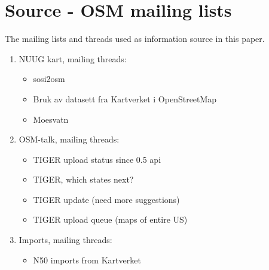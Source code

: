 \documentclass[12pt, a4paper]{report}   	%
\begin{document}
	
%







\chapter{Source - OSM mailing lists}
The mailing lists and threads used as information source in this paper.\\ 
\begin{enumerate}
 \item NUUG kart, mailing threads: \label{mail:nuugkart} 
 	\begin{itemize}
 		 \item sosi2osm \cite{Gnonthgol2013}
 		 \item Bruk av datasett fra Kartverket i OpenStreetMap \cite{Kihle2014}
 		 \item Moesvatn \cite{Didriksen2014}
 	\end{itemize}
 \item OSM-talk, mailing threads: \label{mail:osmtalk}
 	 \begin{itemize}
 		\item TIGER upload status since 0.5 api \cite{Munro2007}
 		\item TIGER, which states next? \cite{Mielczarek2007}
 		\item TIGER update (need more suggestions) \cite{Hansen2007b}
 		\item TIGER upload queue (maps of entire US) \cite{Hansen2007}
 	\end{itemize}
 \item Imports, mailing threads: \label{mail:imports}
 	 \begin{itemize}
 		 \item N50 imports from Kartverket \cite{Mehus2014}
 	\end{itemize}
 \end{enumerate} 
 
 
\end{document}
